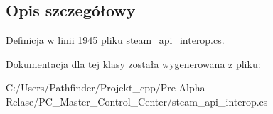 \subsection{Opis szczegółowy}


Definicja w linii 1945 pliku steam\+\_\+api\+\_\+interop.\+cs.



Dokumentacja dla tej klasy została wygenerowana z pliku\+:\begin{DoxyCompactItemize}
\item 
C\+:/\+Users/\+Pathfinder/\+Projekt\+\_\+cpp/\+Pre-\/\+Alpha Relase/\+P\+C\+\_\+\+Master\+\_\+\+Control\+\_\+\+Center/steam\+\_\+api\+\_\+interop.\+cs\end{DoxyCompactItemize}
